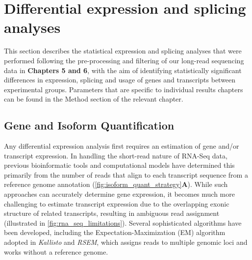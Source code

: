 \section{Differential expression and splicing analyses}

This section describes the statistical expression and splicing analyses that were performed following the pre-processing and filtering of our long-read sequencing data in \textbf{Chapters 5 and 6}, with the aim of identifying statistically significant differences in expression, splicing and usage of genes and transcripts between experimental groups. Parameters that are specific to individual results chapters can be found in the Method section of the relevant chapter. 

\subsection{Gene and Isoform Quantification}\label{sec: gene_isoform_quant_explained}
Any differential expression analysis first requires an estimation of gene and/or transcript expression. In handling the short-read nature of RNA-Seq data, previous bioinformatic tools and computational models have determined this primarily from the number of reads that align to each transcript sequence from a reference genome annotation\cite{Conesa2016} (\cref{fig:isoform_quant_strategy}\textbf{A}). While such approaches can accurately determine gene expression, it becomes much more challenging to estimate transcript expression due to the overlapping exonic structure of related transcripts, resulting in ambiguous read assignment (illustrated in \cref{fig:rna_seq_limitations}). Several sophisticated algorithms have been developed, including the Expectation-Maximization (EM) algorithm adopted in \textit{Kallisto}\cite{Bray2016} and \textit{RSEM}\cite{Li2011}, which assigns reads to multiple genomic loci and works without a reference genome\cite{Conesa2016}. 

